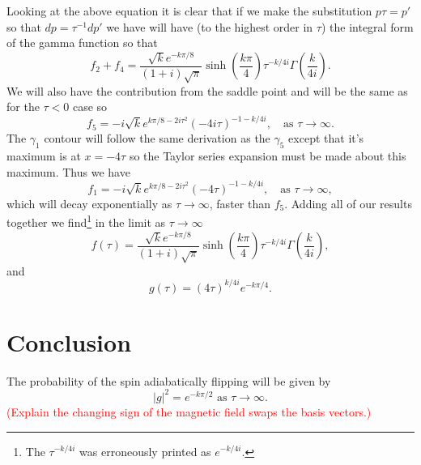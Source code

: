Looking at the above equation it is clear that if we make the substitution $p\tau = p'$ so that $dp = \tau^{-1}dp'$ we have will have (to the highest order in $\tau$) the integral form of the gamma function so that
\begin{equation}
	f_{2}+f_{4} = \frac{\sqrt{k} e^{-k\pi/8}}{\left(1+i\right)\sqrt{\pi}}\sinh\left(\frac{k\pi}{4}\right)\tau^{-k/4i}\Gamma\left(\frac{k}{4i}\right).
\end{equation}
We will also have the contribution from the saddle point and will be the same as for the $\tau < 0$ case so 
\begin{equation}
	f_{5} = -i\sqrt{k}e^{k\pi/8-2i\tau^{2}}\left(-4i \tau\right)^{-1-k/4i}, \quad \text{as } \tau \to \infty.
\end{equation}
The $\gamma_{1}$ contour will follow the same derivation as the $\gamma_{5}$ except that it's maximum is at $x=-4\tau$ so the Taylor series expansion must be made about this maximum. 
Thus we have
\begin{equation}
	f_{1} = -i\sqrt{k}e^{k\pi/8-2i\tau^{2}}\left(-4 \tau\right)^{-1-k/4i}, \quad \text{as } \tau \to \infty,
\end{equation}
which will decay exponentially as $\tau \to \infty$, faster than $f_{5}$.
Adding all of our results together we find\footnote{The $\tau^{-k/4i}$ was erroneously printed as $e^{-k/4i}$.} in the limit as $\tau \to \infty$
\begin{equation}
	f(\tau) =  \frac{\sqrt{k} e^{-k\pi/8}}{\left(1+i\right)\sqrt{\pi}}\sinh\left(\frac{k\pi}{4}\right)\tau^{-k/4i}\Gamma\left(\frac{k}{4i}\right),
\end{equation}
and 
\begin{equation}
	g(\tau) = (4\tau)^{k/4i}e^{-k\pi/4}.
\end{equation}


\section{Conclusion}

The probability of the spin adiabatically flipping will be given by 
\begin{equation}
    \left\vert g \right\vert^{2} = e^{-k\pi/2} \textrm{ as } \tau \to \infty. \label{eq:majProb}
\end{equation}
\textcolor{red}{(Explain the changing sign of the magnetic field swaps the basis vectors.)}


